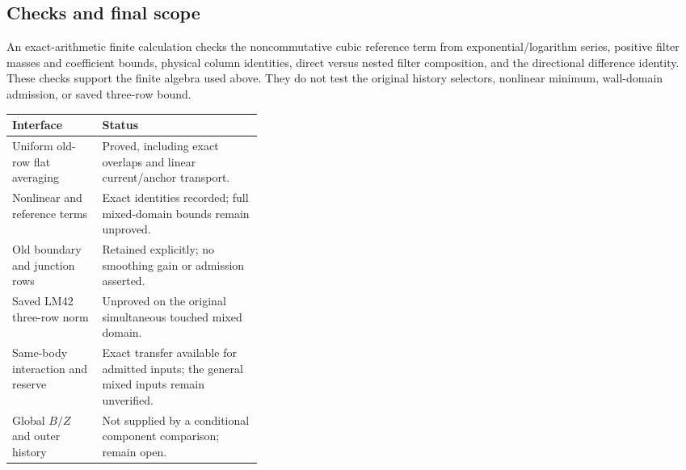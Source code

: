 \documentclass[11pt,letterpaper]{article}
\theoremstyle{plain}
\theoremstyle{remark}\newtheorem{remark}[theorem]{Scope}
\begin{document}
\subsection{Checks and final scope}

An exact-arithmetic finite calculation checks the noncommutative cubic
reference term from exponential/logarithm series, positive filter masses
and coefficient bounds, physical column identities, direct versus nested
filter composition, and the directional difference identity. These checks
support the finite algebra used above. They do not test the original
history selectors, nonlinear minimum, wall-domain admission, or saved
three-row bound.

\begin{center}
\begin{tabularx}{\linewidth}{@{}p{0.36\linewidth}X@{}}
\toprule
\textbf{Interface}&\textbf{Status}\\
\midrule
Uniform old-row flat averaging & Proved, including exact overlaps and linear
current/anchor transport.\\
Nonlinear and reference terms & Exact identities recorded; full mixed-domain
bounds remain unproved.\\
Old boundary and junction rows & Retained explicitly; no smoothing gain or
admission asserted.\\
Saved LM42 three-row norm & Unproved on the original simultaneous touched
mixed domain.\\
Same-body interaction and reserve & Exact transfer available for admitted
inputs; the general mixed inputs remain unverified.\\
Global $B/Z$ and outer history & Not supplied by a conditional component
comparison; remain open.\\
\bottomrule
\end{tabularx}
\end{center}
\end{document}
